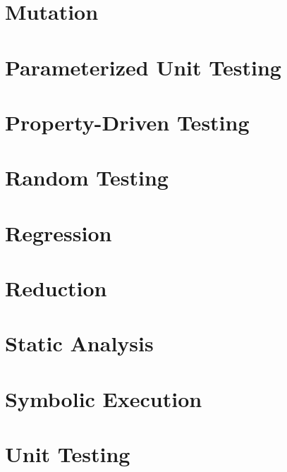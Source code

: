 \section{Mutation}

\section{Parameterized Unit Testing}

\section{Property-Driven Testing}

\section{Random Testing}

\section{Regression}

\section{Reduction}

\section{Static Analysis}

\section{Symbolic Execution}

\section{Unit Testing}
